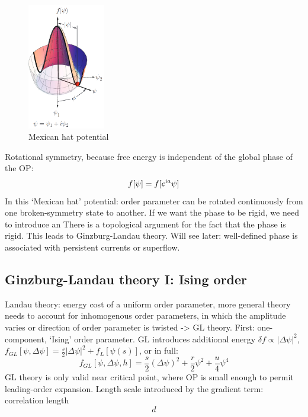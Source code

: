 \documentclass[../notes.tex]{subfiles}
\begin{document}
\begin{figure}[t]
	\centering
	\includegraphics[width=0.3\textwidth]{images/landau free energy mexican hat}
	\caption{Mexican hat potential}
	\label{fig:Landau free energy mexican hat potential}
\end{figure}

Rotational symmetry, because free energy is independent of the global phase of the OP:
\begin{equation}
	f [\psi] = f [e^{\mathrm{i} a } \psi]
\end{equation}
In this `Mexican hat' potential: order parameter can be rotated continuously from one broken-symmetry state to another.
If we want the phase to be rigid, we need to introduce an
There is a topological argument for the fact that the phase is rigid.
This leads to Ginzburg-Landau theory.
Will see later: well-defined phase is associated with persistent currents or superflow.

\subsection{Ginzburg-Landau theory I: Ising order}

Landau theory: energy cost of a uniform order parameter, more general theory needs to account for inhomogenous order parameters, in which the amplitude varies or direction of order parameter is twisted -> GL theory.
First: one-component, `Ising' order parameter.
GL introduces additional energy \(\delta f \propto \vert \Delta \psi \vert^2\), \(f_{GL} [\psi, \Delta \psi] = \frac{s}{2} \vert \Delta \psi \vert^2 + f_L [\psi(s)]\), or in full:
\begin{equation}
	f_{GL} [\psi, \Delta \psi, h] = \frac{s}{2} (\Delta \psi)^2 + \frac{r}{2} \psi^2 + \frac{u}{4} \psi^4
\end{equation}
GL theory is only valid near critical point, where OP is small enough to permit leading-order expansion.
Length scale introduced by the gradient term: correlation length
\begin{equation}
	d
\end{equation}
\end{document}
